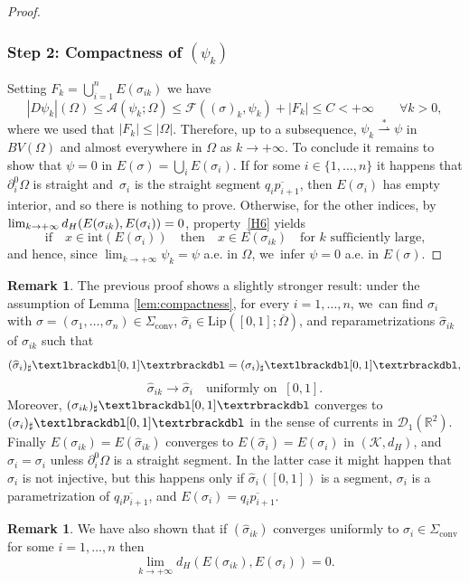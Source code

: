 \documentclass[11pt]{article}
\numberwithin{equation}{section}
\newcommand{\R}{\mathbb{R}}
\let\curves\Sigma
\let\Om\Omega
\newcommand{\weakstar}{\stackrel{*}{\rightharpoonup}}
\newcommand\convexcurves{\curves_\mathrm{conv}}
\newcommand{\jump}[1]{\textup{\textlbrackdbl}{#1}\textup{\textrbrackdbl}}
\newcommand{\Lip}{\mathrm{Lip}}
\theoremstyle{definition}
\newtheorem{remark}[theorem]{Remark}
\begin{document}
\begin{proof}
\subsubsection*{Step 2: Compactness of $(\psi_k)$}
Setting $F_k=\bigcup_{i=1}^nE(\sigma_{ik})$ we have
\begin{equation*}
|D\psi_k|(\Om)\le \mathcal{A}(\psi_k;\Om)\le \mathcal{F}((\sigma)_k,\psi_k)+|F_k|\le C<+\infty \qquad \forall k>0,
\end{equation*}
where we used that $|F_k|\le |\Om|$. Therefore,
up to a subsequence, $\psi_k\weakstar\psi$ in $BV(\Om)$ and almost everywhere in $\Om$ as $k \to +\infty$.
To conclude it remains to show that \hbox{$\psi=0$} in $E(\sigma)=\bigcup_iE(\sigma_{i})$. If for some $i\in \{1,\dots,n\}$ it happens that $\partial_i^0\Om$ is straight and~$\sigma_i$ is the straight segment $\overline{q_{i}p_{i+1}}$, then $E(\sigma_i)$ has empty interior, and so there is nothing to prove. Otherwise, for the other indices, by $\lim_{k \to +\infty}d_H(E(\sigma_{ik}),E(\sigma_i))=\nobreak0$,
property~\ref{H6} yields
\begin{equation*}
\text{if}\quad x\in \text{int}(E(\sigma_i)) \quad \text{then}\quad x\in E(\sigma_{ik})\quad\text{for $k$ sufficiently large,}
\end{equation*}
and hence, since $\lim_{k\to +\infty} \psi_k= \psi$ a.e. in $\Om$, we~infer $\psi=0$ a.e. in $ E(\sigma)$.
\end{proof}

\begin{remark}\label{remark_uniform}
The previous proof shows a slightly stronger result: under the assumption of Lemma \ref{lem:compactness},
for every $i=1,\dots,n$, we~can find $\sigma_i$ with $\sigma=
(\sigma_1,\dots,\sigma_n)\in \Sigma_\mathrm{conv}$, $\widehat \sigma_i\in\Lip([0,1];\overline\Om)$, and
reparametrizations $\widehat\sigma_{ik}$ of $\sigma_{ik}$ such that
\[
(\widehat \sigma_i)_\sharp\jump{[0,1]}=(\sigma_i)_\sharp\jump{[0,1]},
\]
\[
\widehat\sigma_{ik}\to\widehat \sigma_i\quad\text{uniformly on }\ [0,1].
\]
Moreover, $( \sigma_{ik})_\sharp\jump{[0,1]}$ converges to $( \sigma_i)_\sharp\jump{[0,1]}$ in the sense of currents in $\mathcal D_1(\R^2)$.
Finally $E(\sigma_{ik})=E(\widehat\sigma_{ik})$ converges to $ E(\widehat \sigma_i)= E( \sigma_i)$ in $(\mathcal K,d_H)$, and $\widehat \sigma_i=\sigma_i$ unless $\partial_i^0\Om$ is a straight segment. In the latter case it might happen that $\widehat \sigma_i$ is not injective, but this
happens only if $\widehat \sigma_i([0,1])$ is a segment, $\sigma_i$ is a parametrization of $\overline{q_ip_{i+1}}$, and $E(\sigma_i)=\overline{q_ip_{i+1}}$.
\end{remark}
\begin{remark}\label{rem:conv}
We have also shown that if $(\widehat\sigma_{ik})$ converges uniformly to $\sigma_i\in\convexcurves$ for some $i=1,\dots,n$ then
\[
\lim_{k \to +\infty}
d_H(E(\sigma_{ik}),E(\sigma_i))= 0.
\]
\end{remark}
\end{document}
